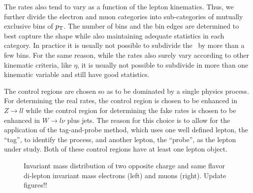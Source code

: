 The rates also tend to vary as a function of the lepton kinematics.
Thus, we further divide the electron
and muon categories into sub-categories of mutually exclusive bins of
$p_{\mathrm{T}}$. The number of bins and the bin edges are determined 
to best capture the shape while also maintaining adequate statistics
in each category. In practice it is usually not possible to subdivide
the \pt~by more than a few bins. For the same reason, while
the rates also surely vary according to other kinematic criteria, 
like $\eta$, it is usually not possible to subdivide in more than
one kinematic variable and still have good statistics.


The control regions are chosen so as to be dominated by a single 
physics process.  For determining the real rates, the 
control region is chosen to be enhanced in $Z\rightarrow ll$
while the control region for determining the fake rates is
chosen to be enhanced in 
$W\rightarrow l\nu$ plus jets.
The reason for this choice is to allow for the application of the
tag-and-probe method, which uses one well defined lepton, the
``tag'', to identify the process, and another lepton, the ``probe'',
as the lepton under study. Both of these control regions
have at least one lepton object. 

\begin{figure}[ht!]
\centering
{}
\centering
{}
\vspace{-10mm}\caption{Invariant mass distribution of two opposite charge and same flavor di-lepton invariant mass electrons (left) and muons (right). Update figures!!}
\label{fig:realEff_CRs}
\end{figure}

